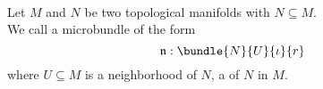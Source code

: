 \\ Let $M$ and $N$ be two topological manifolds with $N \subseteq M$.
\\ We call a microbundle of the form
\[\mathfrak{n}: \bundle{N}{U}{\iota}{r}\]
where $U \subseteq M$ is a neighborhood of $N$, a  of $N$ in $M$.